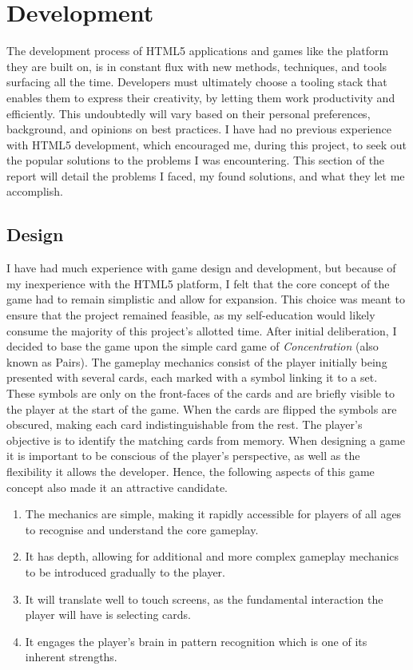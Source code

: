 \documentclass[final]{cmpreport}
\begin{document}
\section{Development}
\label{sec:dev}
The development process of HTML5 applications and games like the platform they are built on, is in constant flux with new methods, techniques, and tools surfacing all the time. Developers must ultimately choose a tooling stack that enables them to express their creativity, by letting them work productivity and efficiently. This undoubtedly will vary based on their personal preferences, background, and opinions on best practices. I have had no previous experience with HTML5 development, which encouraged me, during this project, to seek out the popular solutions to the problems I was encountering. This section of the report will detail the problems I faced, my found solutions, and what they let me accomplish. 

\subsection{Design}
I have had much experience with game design and development, but because of my inexperience with the HTML5 platform, I felt that the core concept of the game had to remain simplistic and allow for expansion. This choice was meant to ensure that the project remained feasible, as my self-education would likely consume the majority of this project's allotted time. After initial deliberation, I decided to base the game upon the simple card game of \textit{Concentration\footnotemark} (also known as Pairs). The gameplay mechanics consist of the player initially being presented with several cards, each marked with a symbol linking it to a set. These symbols are only on the front-faces of the cards and are briefly visible to the player at the start of the game. When the cards are flipped the symbols are obscured, making each card indistinguishable from the rest. The player's objective is to identify the matching cards from memory. When designing a game it is important to be conscious of the player's perspective, as well as the flexibility it allows the developer. Hence, the following aspects of this game concept also made it an attractive candidate.


\begin{enumerate}
  \item The mechanics are simple, making it rapidly accessible for players of all ages to recognise and understand the core gameplay.
  \item It has depth, allowing for additional and more complex gameplay mechanics to be introduced gradually to the player.
  \item It will translate well to touch screens, as the fundamental interaction the player will have is selecting cards.
  \item It engages the player's brain in pattern recognition which is one of its inherent strengths.
\end{enumerate}
\end{document}
